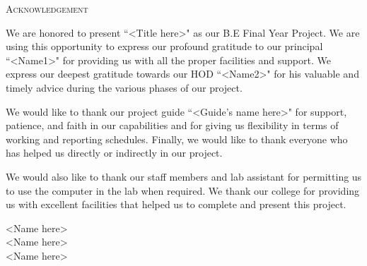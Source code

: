 \newpage

\begin{center}
    \Large \textsc {Acknowledgement}\\[0.5cm]
\end{center}

We are honored to present ``<Title here>" as our B.E Final Year Project.
We are using this opportunity to express our profound gratitude to our principal ``<Name1>" for
providing us with all the proper facilities and support.
We express our deepest gratitude towards our HOD ``<Name2>" for his valuable
and timely advice during the various phases of our project.

\vspace{0.5cm}

We would like to thank our project guide ``<Guide's name here>" for support, patience, and faith in our capabilities
and for giving us flexibility in terms of working and reporting schedules.
Finally, we would like to thank everyone who has helped us directly or indirectly in our project.

\vspace{0.5cm}

We would also like to thank our staff members and lab assistant for permitting us to use
the computer in the lab when required. We thank our college for providing us with excellent
facilities that helped us to complete and present this project.

\vspace{0.5cm}

\begin{flushleft}
    <Name here>\\[0.2cm]
    <Name here>\\[0.2cm]
    <Name here>\\[0.2cm]
\end{flushleft}
